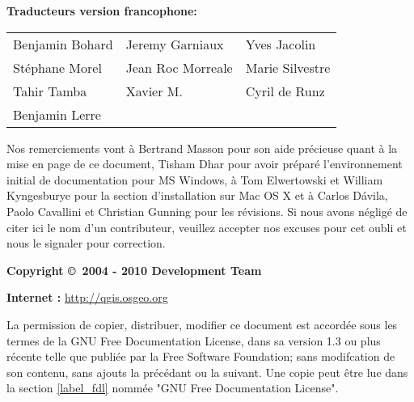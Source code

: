 \begin{flushleft}
\textbf{Traducteurs version francophone:}
  \par\bigskip\noindent
\begin{tabular}{p{4cm} p{4cm} p{4cm}}
Benjamin Bohard & Jeremy Garniaux & Yves Jacolin \\
Stéphane Morel & Jean Roc Morreale & Marie Silvestre \\
Tahir Tamba & Xavier M. & Cyril de Runz \\
Benjamin Lerre \\
\end{tabular}
\end{flushleft}

Nos remerciements vont à Bertrand Masson pour son aide précieuse quant à la mise en page de ce document, Tisham Dhar pour avoir préparé l'environnement initial de documentation pour MS Windows, à Tom Elwertowski et William Kyngesburye pour la section d'installation sur Mac OS X et à Carlos  D\'{a}vila, Paolo Cavallini et Christian Gunning pour les révisions. Si nous avons négligé de citer ici le nom d'un contributeur, veuillez accepter nos excuses pour cet oubli et nous le signaler pour correction.
\par\bigskip\noindent
\textbf{Copyright \copyright~2004 - 2010 \QG Development Team}
\par\bigskip\noindent
\textbf{Internet :} \url{http://qgis.osgeo.org}

\newpage


La permission de copier, distribuer, modifier ce document est accordée sous les termes de la GNU Free Documentation License, dans sa version 1.3 ou plus récente telle que publiée par la Free Software Foundation; sans modifcation de son contenu, sans ajouts la précédant ou la suivant. Une copie peut être lue dans la section \ref{label_fdl} nommée "GNU Free Documentation License".
